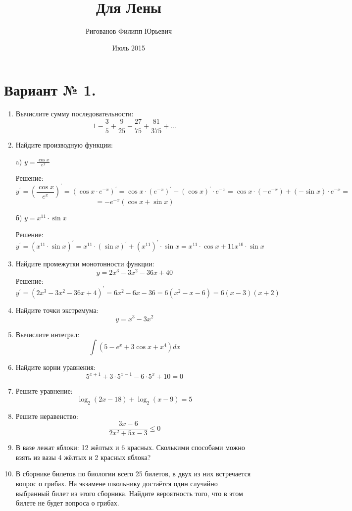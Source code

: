 \documentclass{article}
\title{Для Лены}
\author{Ригованов Филипп Юрьевич}
\date{Июль 2015}
\begin{document}
\maketitle
\section*{Вариант № 1.}
\begin{enumerate}

\item %
Вычислите сумму последовательности:
$$1-\frac{3}{5}+\frac{9}{25}-\frac{27}{75}+\frac{81}{375}+\ldots$$
\item %
Найдите производную функции:

a) $y=\frac{\cos{x}}{e^x}$

Решение:
$$y^\prime=\left(\frac{\cos{x}}{e^x}\right)^\prime=\left(\cos{x}\cdot e^{-x}\right)^\prime=\cos{x}\cdot\left(e^{-x}\right)^\prime+\left(\cos{x}\right)^\prime\cdot e^{-x}=\cos{x}\cdot\left(-e^{-x}\right)+\left(-\sin{x}\right)\cdot e^{-x}=$$ $$=-e^{-x}\left(\cos{x}+\sin{x}\right)$$

б) $y=x^{11}\cdot\sin{x}$

Решение:
$$y^\prime=\left(x^{11}\cdot\sin{x}\right)^\prime=x^{11}\cdot\left(\sin{x}\right)^\prime+\left(x^{11}\right)^\prime\cdot\sin{x}=x^{11}\cdot\cos{x}+11x^{10}\cdot\sin{x}$$

\item %
Найдите промежутки монотонности функции:
$$y=2x^3-3x^2-36x+40$$
Решение:
$$y^\prime=\left(2x^3-3x^2-36x+4\right)^\prime=6x^2-6x-36=6\left(x^2-x-6\right)=6(x-3)(x+2)$$

\item %
Найдите точки экстремума:
$$y=x^3-3x^2$$

\item %
Вычислите интеграл:
$$\int{\left(5-e^x+3\cos{x}+x^4\right)dx}$$

\item %
Найдите корни уравнения:
$$5^{x+1}+3\cdot5^{x-1}-6\cdot5^x+10=0$$

\item %
Решите уравнение:
$$\log_2{(2x-18)}+\log_2{(x-9)}=5$$

\item %
Решите неравенство:
$$\frac{3x-6}{2x^2+5x-3}\leq0$$

\item %
В вазе лежат яблоки: 12 жёлтых и 6 красных. Сколькими способами можно взять из вазы 4 жёлтых и 2 красных яблока?

\item %
В сборнике билетов по биологии всего 25 билетов, в двух из них встречается вопрос о грибах. На экзамене школьнику достаётся один случайно выбранный билет из этого сборника. Найдите вероятность того, что в этом билете не будет вопроса о грибах.

\end{enumerate}
\end{document}
